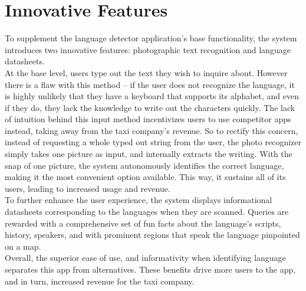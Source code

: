 \section{Innovative Features}
\label{sec:innovative_features}


To supplement the language detector application’s base functionality, the system introduces two innovative features: photographic text recognition and language datasheets.\\

At the base level, users type out the text they wish to inquire about. However there is a flaw with this method – if the user does not recognize the language, it is highly unlikely that they have a keyboard that supports its alphabet, and even if they do, they lack the knowledge to write out the characters quickly. The lack of intuition behind this input method incentivizes users to use competitor apps instead, taking away from the taxi company’s revenue. So to rectify this concern, instead of requesting a whole typed out string from the user, the photo recognizer simply takes one picture as input, and internally extracts the writing. With the snap of one picture, the system autonomously identifies the correct language, making it the most convenient option available. This way, it sustains all of its users, leading to increased usage and revenue.\\

To further enhance the user experience, the system displays informational datasheets corresponding to the languages when they are scanned. Queries are rewarded with a comprehensive set of fun facts about the language’s scripts, history, speakers, and with prominent regions that speak the language pinpointed on a map.\\

Overall, the superior ease of use, and informativity when identifying language separates this app from alternatives. These benefits drive more users to the app, and in turn, increased revenue for the taxi company.\\  

